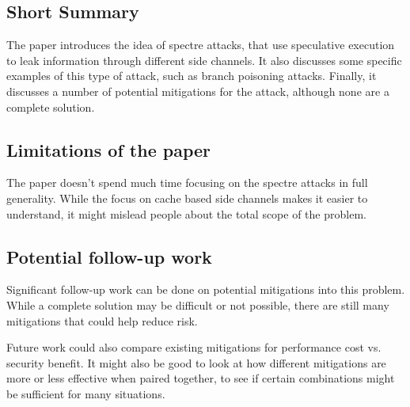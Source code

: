 \documentclass[11pt]{article}
\begin{document}
\subsection*{Short Summary}

The paper introduces the idea of spectre attacks, that use speculative execution to leak information through different side channels.
It also discusses some specific examples of this type of attack, such as branch poisoning attacks.
Finally, it discusses a number of potential mitigations for the attack, although none are a complete solution.

\subsection*{Limitations of the paper}

The paper doesn't spend much time focusing on the spectre attacks in full generality. While the focus on cache based side channels makes it easier to understand, it might mislead people about the total scope of the problem.

\subsection*{Potential follow-up work}

Significant follow-up work can be done on potential mitigations into this problem. While a complete solution may be difficult or not possible, there are still many mitigations that could help reduce risk.

Future work could also compare existing mitigations for performance cost vs. security benefit. It might also be good to look at how different mitigations are more or less effective when paired together, to see if certain combinations might be sufficient for many situations.
\end{document}
